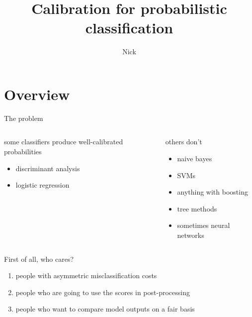 \documentclass[ignorenonframetext,]{beamer}
\title{Calibration for probabilistic classification}
\subtitle{Nick}
\date{}
\providecommand{\tightlist}{%
\setlength{\itemsep}{0pt}\setlength{\parskip}{0pt}}
\begin{document}
\frame{\titlepage}

\section{Overview}\label{overview}

\begin{frame}{The problem}

\begin{columns}[t]
\begin{column}{0.48\textwidth}

\begin{block}{some classifiers produce well-calibrated probabilities}

\begin{itemize}
\item discriminant analysis
\item logistic regression
\end{itemize}

\end{block}
\end{column}


\begin{column}{0.48\textwidth}
\begin{block}{others don't}
\vspace{3mm}
\begin{itemize}
\item naive bayes
\item SVMs
\item anything with boosting
\item tree methods
\item sometimes neural networks
\end{itemize}
\end{block}

\end{column}
\end{columns}

\end{frame}

\begin{frame}{First of all, who cares?}

\begin{enumerate}
\def\labelenumi{\arabic{enumi}.}
\tightlist
\item
  people with asymmetric misclassification costs \vspace{2mm}
\item
  people who are going to use the scores in post-processing \vspace{2mm}
\item
  people who want to compare model outputs on a fair basis
\end{enumerate}

\end{frame}
\end{document}
